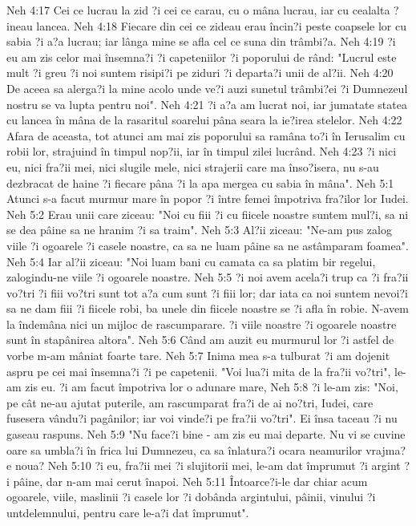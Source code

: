 Neh 4:17  Cei ce lucrau la zid ?i cei ce carau, cu o mâna lucrau, iar cu cealalta ?ineau lancea.
Neh 4:18  Fiecare din cei ce zideau erau încin?i peste coapsele lor cu sabia ?i a?a lucrau; iar lânga mine se afla cel ce suna din trâmbi?a.
Neh 4:19  ?i eu am zis celor mai însemna?i ?i capeteniilor ?i poporului de rând: "Lucrul este mult ?i greu ?i noi suntem risipi?i pe ziduri ?i departa?i unii de al?ii.
Neh 4:20  De aceea sa alerga?i la mine acolo unde ve?i auzi sunetul trâmbi?ei ?i Dumnezeul nostru se va lupta pentru noi".
Neh 4:21  ?i a?a am lucrat noi, iar jumatate statea cu lancea în mâna de la rasaritul soarelui pâna seara la ie?irea stelelor.
Neh 4:22  Afara de aceasta, tot atunci am mai zis poporului sa ramâna to?i în Ierusalim cu robii lor, strajuind în timpul nop?ii, iar în timpul zilei lucrând.
Neh 4:23  ?i nici eu, nici fra?ii mei, nici slugile mele, nici strajerii care ma înso?isera, nu s-au dezbracat de haine ?i fiecare pâna ?i la apa mergea cu sabia în mâna".
Neh 5:1  Atunci s-a facut murmur mare în popor ?i între femei împotriva fra?ilor lor Iudei.
Neh 5:2  Erau unii care ziceau: "Noi cu fiii ?i cu fiicele noastre suntem mul?i, sa ni se dea pâine sa ne hranim ?i sa traim".
Neh 5:3  Al?ii ziceau: "Ne-am pus zalog viile ?i ogoarele ?i casele noastre, ca sa ne luam pâine sa ne astâmparam foamea".
Neh 5:4  Iar al?ii ziceau: "Noi luam bani cu camata ca sa platim bir regelui, zalogindu-ne viile ?i ogoarele noastre.
Neh 5:5  ?i noi avem acela?i trup ca ?i fra?ii vo?tri ?i fiii vo?tri sunt tot a?a cum sunt ?i fiii lor; dar iata ca noi suntem nevoi?i sa ne dam fiii ?i fiicele robi, ba unele din fiicele noastre se ?i afla în robie. N-avem la îndemâna nici un mijloc de rascumparare. ?i viile noastre ?i ogoarele noastre sunt în stapânirea altora".
Neh 5:6  Când am auzit eu murmurul lor ?i astfel de vorbe m-am mâniat foarte tare.
Neh 5:7  Inima mea s-a tulburat ?i am dojenit aspru pe cei mai însemna?i ?i pe capetenii. "Voi lua?i mita de la fra?ii vo?tri", le-am zis eu. ?i am facut împotriva lor o adunare mare,
Neh 5:8  ?i le-am zis: "Noi, pe cât ne-au ajutat puterile, am rascumparat fra?i de ai no?tri, Iudei, care fusesera vându?i pagânilor; iar voi vinde?i pe fra?ii vo?tri". Ei însa taceau ?i nu gaseau raspuns.
Neh 5:9  "Nu face?i bine - am zis eu mai departe. Nu vi se cuvine oare sa umbla?i în frica lui Dumnezeu, ca sa înlatura?i ocara neamurilor vrajma?e noua?
Neh 5:10  ?i eu, fra?ii mei ?i slujitorii mei, le-am dat împrumut ?i argint ?i pâine, dar n-am mai cerut înapoi.
Neh 5:11  Întoarce?i-le dar chiar acum ogoarele, viile, maslinii ?i casele lor ?i dobânda argintului, pâinii, vinului ?i untdelemnului, pentru care le-a?i dat împrumut".
